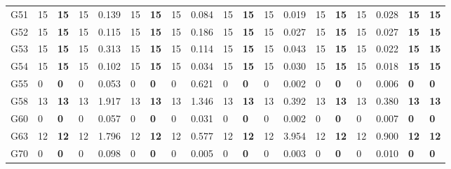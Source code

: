 \documentclass[12pt, a4paper]{article}%
\numberwithin{equation}{section}
\theoremstyle{plain}
\begin{document}
{\begin{landscape}
\begin{longtable}{lllllllllllllllllll}
						G51                       & 15   & \textbf{15} & 15  & 0.139 & 15   & \textbf{15} & 15  & 0.084 & 15   & \textbf{15} & 15  & 0.019 & 15   & \textbf{15} & 15  & 0.028 & \textbf{15}             & \textbf{15}          \\
						G52                       & 15   & \textbf{15} & 15  & 0.115 & 15   & \textbf{15} & 15  & 0.186 & 15   & \textbf{15} & 15  & 0.027 & 15   & \textbf{15} & 15  & 0.027 & \textbf{15}             & \textbf{15}          \\
						G53                       & 15   & \textbf{15} & 15  & 0.313 & 15   & \textbf{15} & 15  & 0.114 & 15   & \textbf{15} & 15  & 0.043 & 15   & \textbf{15} & 15  & 0.022 & \textbf{15}             & \textbf{15}          \\
						G54                       & 15   & \textbf{15} & 15  & 0.102 & 15   & \textbf{15} & 15  & 0.034 & 15   & \textbf{15} & 15  & 0.030 & 15   & \textbf{15} & 15  & 0.018 & \textbf{15}             & \textbf{15}          \\
						G55                       & 0    & \textbf{0}  & 0   & 0.053 & 0    & \textbf{0}  & 0   & 0.621 & 0    & \textbf{0}  & 0   & 0.002 & 0    & \textbf{0}  & 0   & 0.006 & \textbf{0}              & \textbf{0}           \\
						G58                       & 13   & \textbf{13} & 13  & 1.917 & 13   & \textbf{13} & 13  & 1.346 & 13   & \textbf{13} & 13  & 0.392 & 13   & \textbf{13} & 13  & 0.380 & \textbf{13}             & \textbf{13}          \\
						G60                       & 0    & \textbf{0}  & 0   & 0.057 & 0    & \textbf{0}  & 0   & 0.031 & 0    & \textbf{0}  & 0   & 0.002 & 0    & \textbf{0}  & 0   & 0.007 & \textbf{0}              & \textbf{0}           \\
						G63                       & 12   & \textbf{12} & 12  & 1.796 & 12   & \textbf{12} & 12  & 0.577 & 12   & \textbf{12} & 12  & 3.954 & 12   & \textbf{12} & 12  & 0.900 & \textbf{12}             & \textbf{12}          \\
						G70                       & 0    & \textbf{0}  & 0   & 0.098 & 0    & \textbf{0}  & 0   & 0.005 & 0    & \textbf{0}  & 0   & 0.003 & 0    & \textbf{0}  & 0   & 0.010 & \textbf{0}              & \textbf{0}           \\ \hline
					\end{longtable}
				\end{landscape}
			}
			
\end{document}
